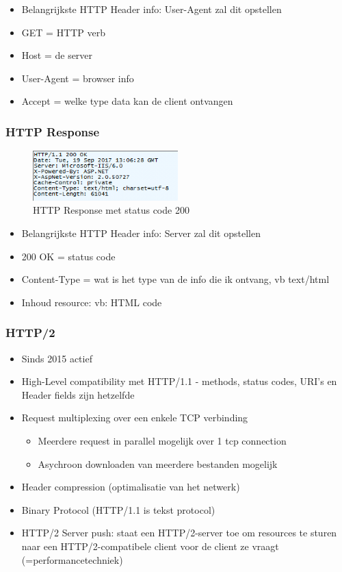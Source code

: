 \documentclass{article}
\begin{document}
\begin{itemize}
    \item Belangrijkste HTTP Header info: User-Agent zal dit opstellen
    \item GET = HTTP verb
    \item Host = de server
    \item User-Agent = browser info
    \item Accept = welke type data kan de client ontvangen
\end{itemize}

\subsubsection{HTTP Response}
\begin{figure}[H]
    \centering
    \includegraphics[width=0.5\textwidth]{http-response.png}
    \caption{HTTP Response met status code 200}
\end{figure}

\begin{itemize}
    \item Belangrijkste HTTP Header info: Server zal dit opstellen
    \item 200 OK = status code
    \item Content-Type = wat is het type van de info die ik ontvang, vb text/html
    \item Inhoud resource: vb: HTML code
\end{itemize}

\subsubsection{HTTP/2}

\begin{itemize}
    \item Sinds 2015 actief
    \item High-Level compatibility met HTTP/1.1 - methods, status codes, URI's en Header fields zijn hetzelfde
    \item Request multiplexing over een enkele TCP verbinding
    \begin{itemize}
        \item Meerdere request in parallel mogelijk over 1 tcp connection
        \item Asychroon downloaden van meerdere bestanden mogelijk
    \end{itemize}
    \item Header compression (optimalisatie van het netwerk)
    \item Binary Protocol (HTTP/1.1 is tekst protocol)
    \item HTTP/2 Server push: staat een HTTP/2-server toe om resources te sturen naar een HTTP/2-compatibele client voor de client ze vraagt (=performancetechniek)
\end{itemize}
\end{document}
